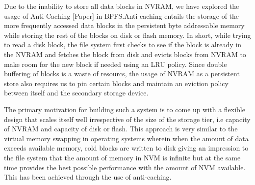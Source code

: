 Due to the inability to store all data blocks in NVRAM, we have explored the usage of Anti-Caching [Paper] in BPFS.Anti-caching entails the storage of the more frequently accessed data blocks in the persistent byte addressable memory while storing the rest of the blocks on disk or flash memory. In short, while trying to read a disk block, the file system first checks to see if the block is already in the NVRAM and fetches the block from disk and evicts blocks from NVRAM to make room for the new block if needed using an LRU policy. Since double buffering of blocks is a waste of resourcs, the usage of NVRAM as a persistent store also requires us to pin certain blocks and maintain an eviction policy between itself and the secondary storage device.

The primary motivation for building such a system is to come up with a flexible design that scales itself well irrespective of the size of the storage tier, i.e capacity of NVRAM and capacity of disk or flash. This approach is very similar to the virtual memory swapping in operating systems wherein when the amount of data exceeds available memory, cold blocks are written to disk giving an impression to the file system that the amount of memory in NVM is infinite but at the same time provides the best possible performance with the amount of NVM available. This has been achieved through the use of anti-caching.